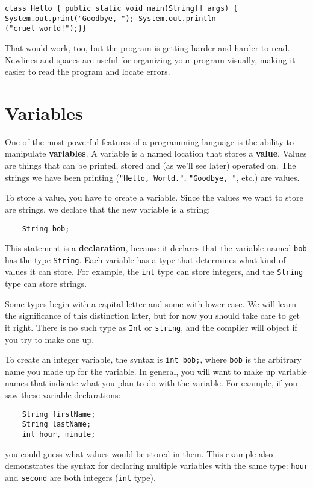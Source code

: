 \documentclass[12pt]{book}
\theoremstyle{definition}
\begin{document}
\begin{lstlisting}
class Hello { public static void main(String[] args) {
System.out.print("Goodbye, "); System.out.println
("cruel world!");}}
\end{lstlisting}
%
That would work, too, but
the program is getting harder and harder to read.  Newlines and
spaces are useful for organizing your program visually, making
it easier to read the program and locate errors.


\section {Variables}

One of the most powerful features of a programming language is the
ability to manipulate {\bf variables}.  A variable is a named location
that stores a {\bf value}.  Values are things that can be printed, stored
and (as we'll see later) operated on.  The strings we have been
printing ({\tt "Hello, World."}, {\tt "Goodbye, "}, etc.)  are values.

To store a value, you have to create a variable.  Since
the values we want to store are strings, we declare that
the new variable is a string:

\begin{lstlisting}
    String bob;
\end{lstlisting}
%
This statement is a {\bf declaration}, because it declares that the
variable named {\tt bob} has the type {\tt String}.  Each variable
has a type that determines what kind of values it can store.  For
example, the {\tt int} type can store integers, and the {\tt String}
type can store strings.


Some types begin with a capital letter and some
with lower-case.  We will learn the significance of this distinction
later, but for now you should take care to get it right.  There is no
such type as {\tt Int} or {\tt string}, and the compiler will object
if you try to make one up.

To create an integer variable, the syntax is {\tt int bob;},
where {\tt bob} is the arbitrary name you made up for the
variable.  In general, you will want to make up variable names
that indicate what you plan to do with the variable.  For
example, if you saw these variable declarations:

\begin{lstlisting}
    String firstName;
    String lastName;
    int hour, minute;
\end{lstlisting}
%
you could guess what values
would be stored in them.  This example
also demonstrates the syntax for declaring multiple variables
with the same type: {\tt hour} and {\tt second}
are both integers ({\tt int} type).
\end{document}

